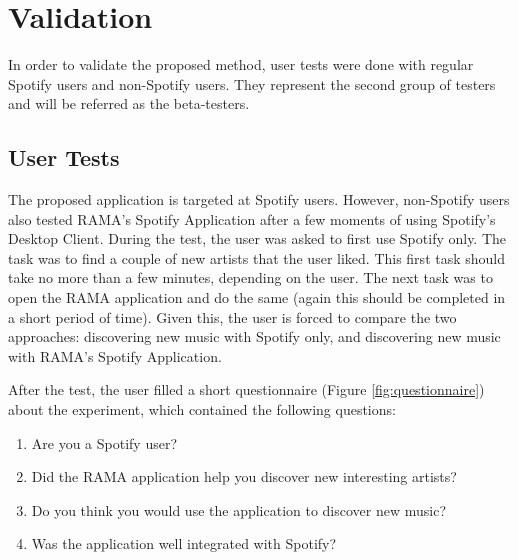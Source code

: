 

  \clearpage

\section{Validation} %
\label{sec:validation}

  In order to validate the proposed method, user tests were done with regular Spotify users and non-Spotify users.
  They represent the second group of testers and will be referred as the beta-testers.

  \subsection{User Tests} %
  \label{sub:user_tests}

    The proposed application is targeted at Spotify users.
    However, non-Spotify users also tested RAMA's Spotify Application after a few moments of using Spotify's Desktop Client.
    During the test, the user was asked to first use Spotify only.
    The task was to find a couple of new artists that the user liked.
    This first task should take no more than a few minutes, depending on the user.
    The next task was to open the RAMA application and do the same (again this should be completed in a short period of time).
    Given this, the user is forced to compare the two approaches: discovering new music with Spotify only, and discovering new music with RAMA's Spotify Application.



    After the test, the user filled a short questionnaire (Figure \ref{fig:questionnaire}) about the experiment, which contained the following questions:

    \begin{enumerate}
      \item Are you a Spotify user?
      \item Did the RAMA application help you discover new interesting artists?
      \item Do you think you would use the application to discover new music?
      \item Was the application well integrated with Spotify?
    \end{enumerate}

